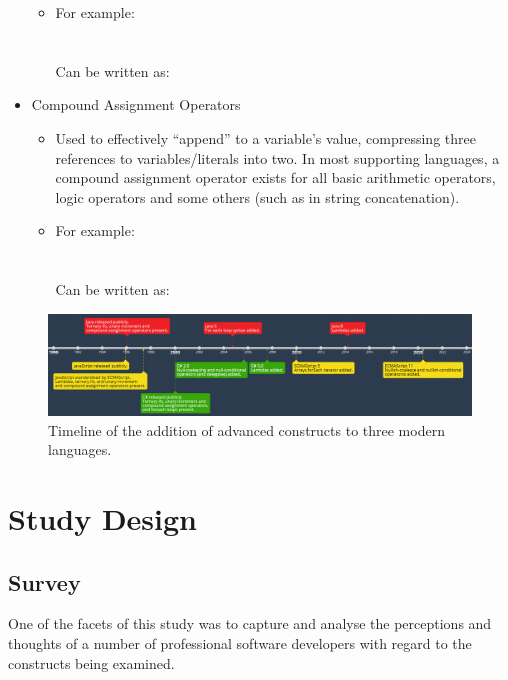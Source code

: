 \documentclass{article}
\begin{document}
\begin{itemize}
\begin{itemize}
                    \item For example:\\
                    \\\\
                    Can be written as:\\
                \end{itemize}
            \item Compound Assignment Operators
                \begin{itemize}
                    \item Used to effectively ``append'' to a variable's value, compressing three references to variables/literals into two. In most supporting languages, a compound assignment operator exists for all basic arithmetic operators, logic operators and some others (such as in string concatenation).
                    \item For example:\\
                    \\\\
                    Can be written as:\\
                \end{itemize}
        \end{itemize}
    
\begin{landscape}
    \begin{figure}[htbp]
        \centering
        \vspace{2in}
        \includegraphics[width=1.5\textheight]{timeline}
        \caption{Timeline of the addition of advanced constructs to three modern languages.}
        \label{fig:timeline}
    \end{figure}
\end{landscape}
\newpage
\section{Study Design}
    \subsection{Survey}
    \label{subsec:survey}
        One of the facets of this study was to capture and analyse the perceptions and thoughts of a number of professional software developers with regard to the constructs being examined.
        
\end{document}
